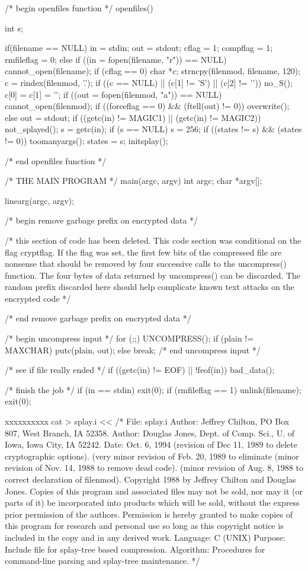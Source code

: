 /* begin openfiles function */
openfiles()
{
	int s;

	if(filename == NULL) {
		in = stdin;
		out = stdout;
		cflag = 1;
		compflag = 1;
		rmfileflag = 0;
	} else {
		if ((in = fopen(filename, "r")) == NULL) {
			cannot_open(filename);
		}
		if (cflag == 0) {
			char *c;
			strncpy(filenmod, filename, 120);
			c = rindex(filenmod, '.');
			if ((c == NULL) || (c[1] != 'S') || (c[2] != '')) {
				no_S();
			}
			c[0] = c[1] = '';
			if ((out = fopen(filenmod, "a")) == NULL) {
				cannot_open(filenmod);
			}
			if ((forceflag == 0) && (ftell(out) != 0)) {
				overwrite();
			}
		} else {
			out = stdout;
		}
	}
	if ((getc(in) != MAGIC1) || (getc(in) != MAGIC2)) {
		not_splayed();
	}
	s = getc(in);
	if (s == NULL) {
		s = 256;
	}
	if ((states != s) && (states != 0)) {
		toomanyargs();
	}
	states = s;
	initsplay();
}
/* end openfiles function */

/* THE MAIN PROGRAM */
main(argc, argv)
int argc;
char *argv[];
{
	linearg(argc, argv);

	/* begin remove garbage prefix on encrypted data */

	/* this section of code has been deleted.  This code section was
           conditional on the flag cryptflag.  If the flag was set, the
	   first few bits of the compressed file are nonsense that should
	   be removed by four successive calls to the uncompress() function.
	   The four bytes of data returned by uncompress() can be discarded.
	   The random prefix discarded here should help complicate known
	   text attacks on the encrypted code */
	
	/* end remove garbage prefix on encrypted data */

	/* begin uncompress input */
	for (;;) {
		UNCOMPRESS();
		if (plain != MAXCHAR) {
			putc(plain, out);
		} else {
			break;
		}
	}
	/* end uncompress input */

	/* see if file really ended */
	if ((getc(in) != EOF) || !feof(in)) {
		bad_data();
	}

	/* finish the job */
	if (in == stdin) {
		exit(0);
	}
	if (rmfileflag == 1) {
		unlink(filename);
	}
	exit(0);
}
xxxxxxxxxx
cat > splay.i <<\xxxxxxxxxx
/* File: splay.i
   Author: Jeffrey Chilton, PO Box 807, West Branch, IA 52358.
   Author: Douglas Jones, Dept. of Comp. Sci., U. of Iowa, Iowa City, IA 52242.
   Date: Oct. 6, 1994
	 (revision of Dec 11, 1989 to delete cryptographic options).
         (very minor revision of Feb. 20, 1989 to eliminate %
	 (minor revision of Nov. 14, 1988 to remove dead code).
	 (minor revision of Aug. 8, 1988 to correct declaration of filenmod).
   Copyright 1988 by Jeffrey Chilton and Douglas Jones.
	      Copies of this program and associated files may not be sold,
			nor may it (or parts of it) be incorporated into
			products which will be sold, without the express
			prior permission of the authors.
	      Permission is hereby granted to make copies of this program for
			research and personal use so long as this copyright
			notice is included in the copy and in any derived work.
   Language: C (UNIX)
   Purpose: Include file for splay-tree based compression.
   Algorithm: Procedures for command-line parsing and splay-tree maintenance.
*/

